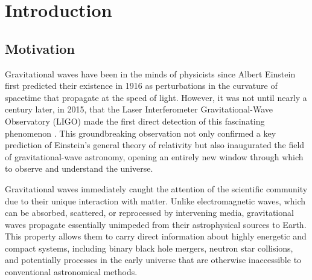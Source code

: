 
\chapter{Introduction}
\label{chapter:introduction}


\section{Motivation}
\label{section:motivation}

Gravitational waves have been in the minds of physicists since Albert Einstein first predicted their existence in 1916 as perturbations in the curvature of spacetime that propagate at the speed of light. However, it was not until nearly a century later, in 2015, that the Laser Interferometer Gravitational-Wave Observatory (LIGO) made the first direct detection of this fascinating phenomenon \cite{PhysRevLett.116.061102}. This groundbreaking observation not only confirmed a key prediction of Einstein's general theory of relativity but also inaugurated the field of gravitational-wave astronomy, opening an entirely new window through which to observe and understand the universe.

Gravitational waves immediately caught the attention of the scientific community due to their unique interaction with matter. Unlike electromagnetic waves, which can be absorbed, scattered, or reprocessed by intervening media, gravitational waves propagate essentially unimpeded from their astrophysical sources to Earth. This property allows them to carry direct information about highly energetic and compact systems, including binary black hole mergers, neutron star collisions, and potentially processes in the early universe that are otherwise inaccessible to conventional astronomical methods.

